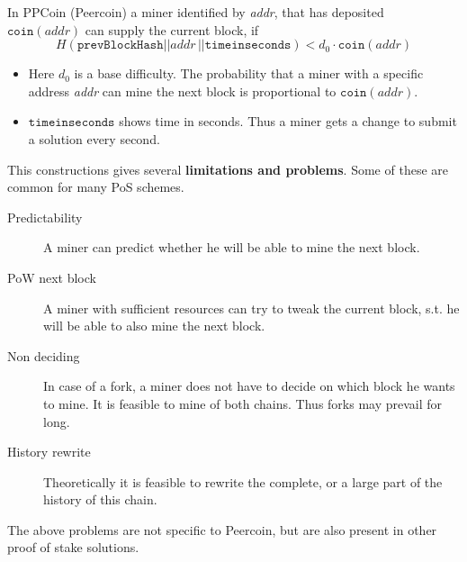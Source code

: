 \begin{example}
In PPCoin (Peercoin) a miner identified by \textit{addr}, that has deposited $\mathtt{coin}(\textit{addr})$ can supply the current block, if 
\[
	H(\mathtt{prevBlockHash} || \textit{addr}\, || \mathtt{time in seconds}) < d_0 \cdot \mathtt{coin}(\textit{addr})
\]
\begin{itemize}
	\item Here $d_0$ is a base difficulty. The probability that a miner with a specific address \textit{addr} can mine the next block is proportional to $\mathtt{coin}(\textit{addr})$.
	\item $\mathtt{timeinseconds}$ shows time in seconds. Thus a miner gets a change to submit a solution every second.
\end{itemize}

This constructions gives several \textbf{limitations and problems}. Some of these are common for many PoS schemes.
\begin{description}
	\item[Predictability] A miner can predict whether he will be able to mine the next block.
	\item[PoW next block] A miner with sufficient resources can try to tweak the current block, s.t. he will be able to also mine the next block. 
	\item[Non deciding] In case of a fork, a miner does not have to decide on which block he wants to mine. It is feasible to mine of both chains. Thus forks may prevail for long.
	\item[History rewrite] Theoretically it is feasible to rewrite the complete, or a large part of the history of this chain. 
\end{description}
The above problems are not specific to Peercoin, but are also present in other proof of stake solutions.
\end{example}